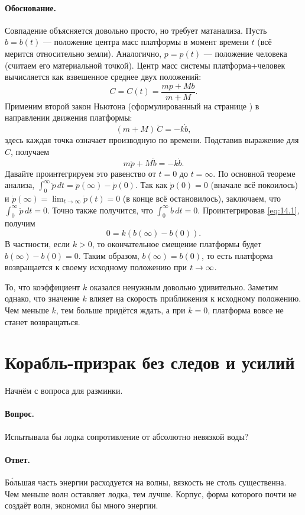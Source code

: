 \paragraph{Обоснование.}
Совпадение объясняется довольно просто, но требует матанализа.
Пусть $b=b(t)$ --- положение центра масс платформы в момент времени $t$ (всё мерится относительно земли).
Аналогично, $p=p(t)$ --- положение человека
(считаем его материальной точкой).
Центр масс системы платформа+человек вычисляется как взвешенное среднее двух положений:
\[C=C(t)=\frac{m p + M b}{m + M}.\]
Применим второй закон Ньютона (сформулированный на странице \pageref{Законы Ньютона}) в направлении движения платформы:
\[(m+M)\,\ddot{C}=-k \dot{b},\]
здесь каждая точка означает производную по времени.
Подставив выражение для $C$, получаем
\begin{equation}
m \ddot{p} + M \ddot{b}=-k \dot{b}.
\label{eq:14.1}
\end{equation}
Давайте проинтегрируем это равенство от $t=0$ до $t=\infty$.
По основной теореме анализа,
$\int_0^\infty \ddot{p}\,dt=\dot{p}(\infty) - \dot{p}(0)$.
Так как $\dot{p}(0)=0$ (вначале всё покоилось) и
$\dot{p}(\infty)=\lim_{t\to\infty}\dot{p}(t)=0$ (в конце всё остановилось),
заключаем, что
$\int_0^\infty \ddot{p}\,dt=0$.
Точно также получится, что
$\int_0^\infty \ddot{b}\,dt=0$.
Проинтегрировав \eqref{eq:14.1}, получим
\[0= k(b(\infty) - b(0)).\]
В частности, если $k > 0$, то окончательное смещение платформы будет $b(\infty) - b(0)=0$.
Таким образом, $b(\infty)=b(0)$, то есть платформа возвращается к своему исходному положению при $t\z\to\infty$.

То, что коэффициент $k$ оказался ненужным довольно удивительно.
Заметим однако, что значение $k$ влияет на скорость
приближения к исходному положению.
Чем меньше $k$, тем больше придётся ждать, а при $k=0$, платформа вовсе не станет возвращаться.

\section{Корабль-призрак без следов и усилий}

Начнём с вопроса для разминки.

\paragraph{Вопрос.}
Испытывала бы лодка сопротивление от абсолютно невязкой воды?

\paragraph{Ответ.}
Б\'{о}льшая часть энергии расходуется на волны, вязкость не столь существенна.
Чем меньше волн оставляет лодка, тем лучше.
Корпус, форма которого почти не создаёт волн, экономил бы много энергии.

